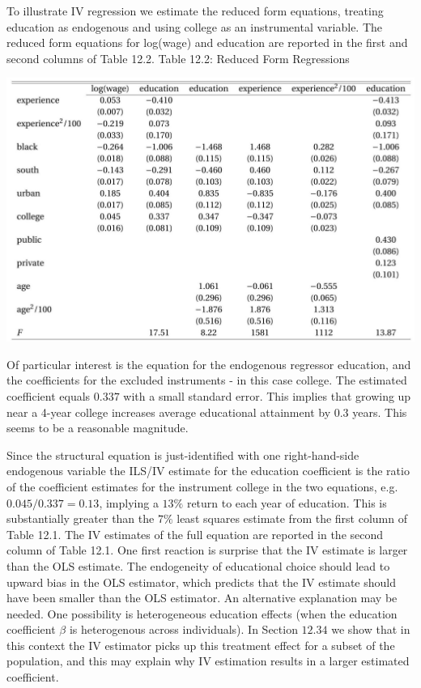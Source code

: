 \documentclass[10pt]{article}
\begin{document}
To illustrate IV regression we estimate the reduced form equations, treating education as endogenous and using college as an instrumental variable. The reduced form equations for log(wage) and education are reported in the first and second columns of Table 12.2. Table 12.2: Reduced Form Regressions

\includegraphics[max width=\textwidth]{2022_09_17_f9391324ededdbb7a34eg-11}

Of particular interest is the equation for the endogenous regressor education, and the coefficients for the excluded instruments - in this case college. The estimated coefficient equals $0.337$ with a small standard error. This implies that growing up near a 4-year college increases average educational attainment by $0.3$ years. This seems to be a reasonable magnitude.

Since the structural equation is just-identified with one right-hand-side endogenous variable the ILS/IV estimate for the education coefficient is the ratio of the coefficient estimates for the instrument college in the two equations, e.g. $0.045 / 0.337=0.13$, implying a $13 \%$ return to each year of education. This is substantially greater than the $7 \%$ least squares estimate from the first column of Table 12.1. The IV estimates of the full equation are reported in the second column of Table 12.1. One first reaction is surprise that the IV estimate is larger than the OLS estimate. The endogeneity of educational choice should lead to upward bias in the OLS estimator, which predicts that the IV estimate should have been smaller than the OLS estimator. An alternative explanation may be needed. One possibility is heterogeneous education effects (when the education coefficient $\beta$ is heterogenous across individuals). In Section $12.34$ we show that in this context the IV estimator picks up this treatment effect for a subset of the population, and this may explain why IV estimation results in a larger estimated coefficient.
\end{document}

